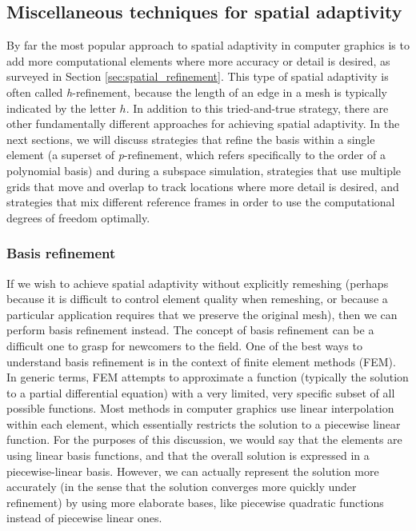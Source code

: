 \subsection{Miscellaneous techniques for spatial adaptivity} \label{sec pr adaptivity}

By far the most popular approach to spatial adaptivity in computer graphics is to add more computational elements where more accuracy or detail is desired, as surveyed in Section \ref{sec:spatial_refinement}. This type of spatial adaptivity is often called \textit{h}-refinement, because the length of an edge in a mesh is typically indicated by the letter $h$. In addition to this tried-and-true strategy, there are other fundamentally different approaches for achieving spatial adaptivity. In the next sections, we will discuss strategies that refine the basis within a single element (a superset of \textit{p}-refinement, which refers specifically to the order of a polynomial basis) and during a subspace simulation, strategies that use multiple grids that move and overlap to track locations where more detail is desired, and strategies that mix different reference frames in order to use the computational degrees of freedom optimally.

\subsubsection{Basis refinement}
\label{sec:basis_refinement}
If we wish to achieve spatial adaptivity without explicitly remeshing (perhaps because it is difficult to control element quality when remeshing, or because a particular application requires that we preserve the original mesh), then we can perform basis refinement instead. The concept of basis refinement can be a difficult one to grasp for newcomers to the field. One of the best ways to understand basis refinement is in the context of finite element methods (FEM). In generic terms, FEM attempts to approximate a function (typically the solution to a partial differential equation) with a very limited, very specific subset of all possible functions. Most methods in computer graphics use linear interpolation within each element, which essentially restricts the solution to a piecewise linear function. For the purposes of this discussion, we would say that the elements are using linear basis functions, and that the overall solution is expressed in a piecewise-linear basis. However, we can actually represent the solution more accurately (in the sense that the solution converges more quickly under refinement) by using more elaborate bases, like piecewise quadratic functions instead of piecewise linear ones.

